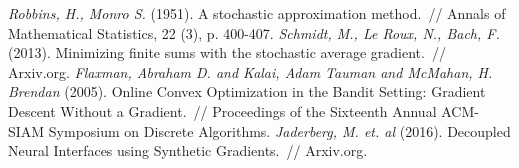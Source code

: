 \documentclass[12pt,fleqn]{article}
\begin{document}
\begin{thebibliography}{1}
    \emph{Robbins, H., Monro S.} (1951).
    A stochastic approximation method.~//
    Annals of Mathematical Statistics,
    22 (3), p. 400-407.
    \emph{Schmidt, M., Le Roux, N., Bach, F. } (2013).
    Minimizing finite sums with the stochastic average gradient.~//
    Arxiv.org.
    \emph{Flaxman, Abraham D. and Kalai, Adam Tauman and McMahan, H. Brendan} (2005).
    Online Convex Optimization in the Bandit Setting: Gradient Descent Without a Gradient.~//
    Proceedings of the Sixteenth Annual ACM-SIAM Symposium on Discrete Algorithms.
    \emph{Jaderberg, M. et. al} (2016).
    Decoupled Neural Interfaces using Synthetic Gradients.~//
    Arxiv.org.
\end{thebibliography}
\end{document}

